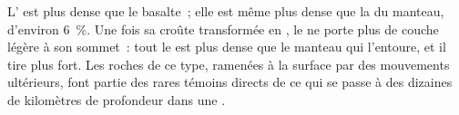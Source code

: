 L' est plus dense que le basalte~; elle est même plus dense que la
 du manteau, d'environ \qty{6}{\percent}. Une fois sa croûte
transformée en , le  ne porte plus de couche
légère à son sommet~: tout le  est plus dense que le manteau qui
l'entoure, et il tire plus fort. Les roches de ce type, ramenées à la
surface par des mouvements ultérieurs, font partie des rares témoins
directs de ce qui se passe à des dizaines de kilomètres de profondeur dans
une .

